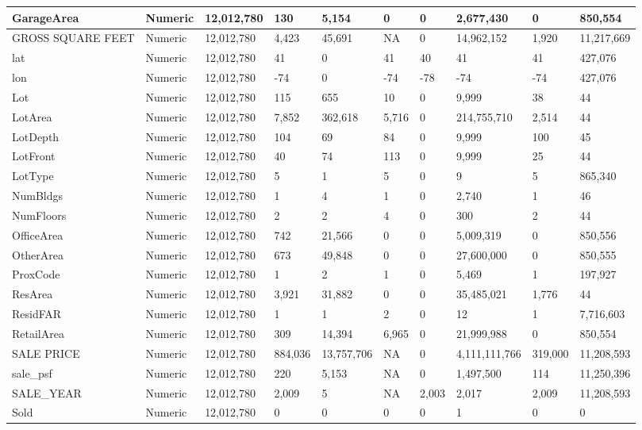 \documentclass[conference,final,]{IEEEtran}
\begin{document}
\begin{table}
\begin{tabular}[t]{l|l|l|l|l|l|l|l|l|l}
\hline
GarageArea & Numeric & 12,012,780 & 130 & 5,154 & 0 & 0 & 2,677,430 & 0 & 850,554\\
\hline
GROSS SQUARE FEET & Numeric & 12,012,780 & 4,423 & 45,691 & NA & 0 & 14,962,152 & 1,920 & 11,217,669\\
\hline
lat & Numeric & 12,012,780 & 41 & 0 & 41 & 40 & 41 & 41 & 427,076\\
\hline
lon & Numeric & 12,012,780 & -74 & 0 & -74 & -78 & -74 & -74 & 427,076\\
\hline
Lot & Numeric & 12,012,780 & 115 & 655 & 10 & 0 & 9,999 & 38 & 44\\
\hline
LotArea & Numeric & 12,012,780 & 7,852 & 362,618 & 5,716 & 0 & 214,755,710 & 2,514 & 44\\
\hline
LotDepth & Numeric & 12,012,780 & 104 & 69 & 84 & 0 & 9,999 & 100 & 45\\
\hline
LotFront & Numeric & 12,012,780 & 40 & 74 & 113 & 0 & 9,999 & 25 & 44\\
\hline
LotType & Numeric & 12,012,780 & 5 & 1 & 5 & 0 & 9 & 5 & 865,340\\
\hline
NumBldgs & Numeric & 12,012,780 & 1 & 4 & 1 & 0 & 2,740 & 1 & 46\\
\hline
NumFloors & Numeric & 12,012,780 & 2 & 2 & 4 & 0 & 300 & 2 & 44\\
\hline
OfficeArea & Numeric & 12,012,780 & 742 & 21,566 & 0 & 0 & 5,009,319 & 0 & 850,556\\
\hline
OtherArea & Numeric & 12,012,780 & 673 & 49,848 & 0 & 0 & 27,600,000 & 0 & 850,555\\
\hline
ProxCode & Numeric & 12,012,780 & 1 & 2 & 1 & 0 & 5,469 & 1 & 197,927\\
\hline
ResArea & Numeric & 12,012,780 & 3,921 & 31,882 & 0 & 0 & 35,485,021 & 1,776 & 44\\
\hline
ResidFAR & Numeric & 12,012,780 & 1 & 1 & 2 & 0 & 12 & 1 & 7,716,603\\
\hline
RetailArea & Numeric & 12,012,780 & 309 & 14,394 & 6,965 & 0 & 21,999,988 & 0 & 850,554\\
\hline
SALE PRICE & Numeric & 12,012,780 & 884,036 & 13,757,706 & NA & 0 & 4,111,111,766 & 319,000 & 11,208,593\\
\hline
sale\_psf & Numeric & 12,012,780 & 220 & 5,153 & NA & 0 & 1,497,500 & 114 & 11,250,396\\
\hline
SALE\_YEAR & Numeric & 12,012,780 & 2,009 & 5 & NA & 2,003 & 2,017 & 2,009 & 11,208,593\\
\hline
Sold & Numeric & 12,012,780 & 0 & 0 & 0 & 0 & 1 & 0 & 0\\

\end{tabular}
\end{table}
\end{document}
